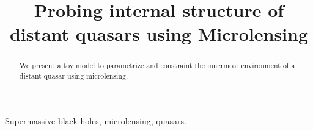 \documentclass[usenatbib,twocolumn]{mn2e}
\title{Probing internal structure of distant quasars using Microlensing}
\begin{document}
\maketitle

\begin{abstract}
We present a toy model to parametrize and constraint the innermost environment of a distant quasar using microlensing. 
\end{abstract}


\begin{keywords}
Supermassive black holes, microlensing, quasars.
\end{keywords}















\citep{2006MNRAS.367.1209L}





\def\apj{ApJ}
\def\apjl{ApJL}
\def\aj{AJ}
\def\mnras{MNRAS}
\def\aap{A\&A}


\end{document}
